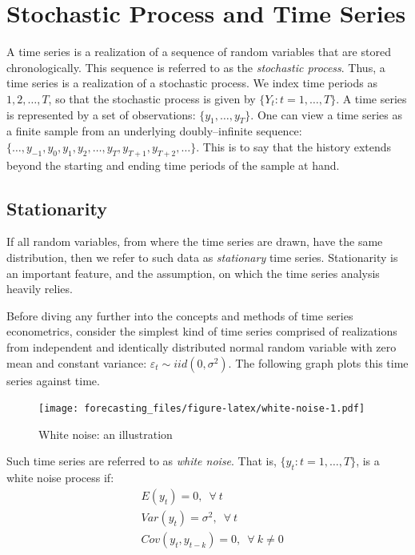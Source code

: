 \documentclass[
  12pt,
  oneside]{book}
\begin{document}
\hypertarget{stochastic-process-and-time-series}{%
\chapter{Stochastic Process and Time Series}\label{stochastic-process-and-time-series}}

A time series is a realization of a sequence of random variables that are stored chronologically. This sequence is referred to as the \emph{stochastic process}. Thus, a time series is a realization of a stochastic process. We index time periods as \(1,2,\ldots,T\), so that the stochastic process is given by \(\{Y_t:t=1,\ldots,T\}\). A time series is represented by a set of observations: \(\{y_1,\ldots,y_T\}\). One can view a time series as a finite sample from an underlying doubly--infinite sequence: \(\{\ldots,y_{-1},y_{0},y_1,y_2,\ldots,y_T,y_{T+1},y_{T+2},\ldots\}\). This is to say that the history extends beyond the starting and ending time periods of the sample at hand.

\hypertarget{stationarity}{%
\section{Stationarity}\label{stationarity}}

If all random variables, from where the time series are drawn, have the same distribution, then we refer to such data as \emph{stationary} time series. Stationarity is an important feature, and the assumption, on which the time series analysis heavily relies.

Before diving any further into the concepts and methods of time series econometrics, consider the simplest kind of time series comprised of realizations from independent and identically distributed normal random variable with zero mean and constant variance: \(\varepsilon_t \sim iid\left(0,\sigma^2\right)\). The following graph plots this time series against time.

\begin{figure}
\centering
\texttt{[image: forecasting\_files/figure-latex/white-noise-1.pdf]}
\caption{\label{fig:white-noise}White noise: an illustration}
\end{figure}

Such time series are referred to as \emph{white noise}. That is, \(\{y_t: t=1,\ldots,T\}\), is a white noise process if:
\begin{align*}
& E(y_t) = 0,\;~\forall~t\\
& Var(y_t) = \sigma^2,\;~\forall~t\\
& Cov(y_t,y_{t-k}) = 0,\;~\forall~k \ne 0
\end{align*}
\end{document}
